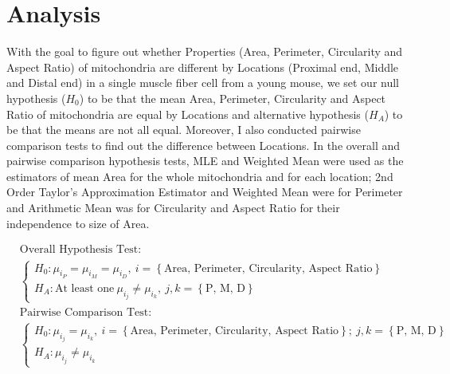 \documentclass{article}\usepackage[]{graphicx}\usepackage[]{color}
\numberwithin{figure}{subsection} %
\numberwithin{table}{subsection} %
\begin{document}
\setcounter{section}{5}
\setcounter{page}{26}

\section{Analysis}
With the goal to figure out whether Properties (Area, Perimeter, Circularity and Aspect Ratio) of mitochondria are different by Locations (Proximal end, Middle and Distal end) in a single muscle fiber cell from a young mouse, we set our null hypothesis (${H}_{0}$) to be that the mean Area, Perimeter, Circularity and Aspect Ratio of mitochondria are equal by Locations and alternative hypothesis  
 (${H}_{A}$) to be that the means are not all equal. Moreover, I also conducted pairwise comparison tests to find out the difference between Locations. In the overall and pairwise comparison hypothesis tests, MLE and Weighted Mean were used as the estimators of mean Area for the whole mitochondria and for each location; 2nd Order Taylor's Approximation Estimator and Weighted Mean were for Perimeter and Arithmetic Mean was for Circularity and Aspect Ratio for their independence to size of Area. 

\begin{align*}
&\text{Overall Hypothesis Test:} \\
&\begin{cases}
      {H}_{0}: {\mu}_{{i}_{P}} = {\mu}_{{i}_{M}} = {\mu}_{{i}_{D}}, \: i = \left \{ \text{Area, Perimeter, Circularity, Aspect Ratio} \right \} \\
      {H}_{A}: \text{At least one} \: {\mu}_{{i}_{j}} \neq  {\mu}_{{i}_{k}}, \:  j,k = \left \{ \text{P, M, D} \right \}
   \end{cases}\\
&\text{Pairwise Comparison Test:}\\
&\begin{cases}
      {H}_{0}: {\mu}_{{i}_{j}} = {\mu}_{{i}_{k}}, \: i = \left \{ \text{Area, Perimeter, Circularity, Aspect Ratio} \right \}; \: j,k = \left \{ \text{P, M, D} \right \} \\
      {H}_{A}: {\mu}_{{i}_{j}} \neq  {\mu}_{{i}_{k}}
   \end{cases}
\end{align*}
\end{document}
